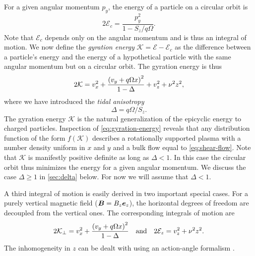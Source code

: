 \documentclass[aps,pre,notitlepage,amsmath,amssymb,amsfonts,nobibnotes,nofootinbib]{revtex4-1}
\begin{document}
For a given angular momentum $p_y$, the energy of a particle on a circular
orbit is
\begin{equation}
  2\mathcal{E}_c = \frac{p_y^2}{1 - S_z/q\Omega}.
\end{equation}
Note that $\mathcal{E}_c$ depends only on the angular momentum and is thus an
integral of motion. We now define the \emph{gyration energy}
$\mathcal{K}=\mathcal{E}-\mathcal{E}_c$ as the difference between a particle's
energy and the energy of a hypothetical particle with the same angular
momentum but on a circular orbit. The gyration energy is thus
\begin{equation}
  \label{eq:gyration-energy}
  2\mathcal{K} =
  v_x^2 + \frac{{(v_y + q\Omega x)}^2}{1-\Delta} + v_z^2 + \vfreq^2 z^2,
\end{equation}
where we have introduced the \emph{tidal anisotropy}
\begin{equation}
  \label{eq:tidal-anisotropy}
  \Delta = q\Omega/S_z.
\end{equation}
The gyration energy $\mathcal{K}$ is the natural generalization of the
epicyclic energy \citep{Shu1969} to charged particles. Inspection of
\cref{eq:gyration-energy} reveals that any distribution function of the form
$f(\mathcal{K})$ describes a rotationally supported plasma with a number
density uniform in $x$ and $y$ and a bulk flow equal to \cref{eq:shear-flow}.
Note that $\mathcal{K}$ is manifestly positive definite as long as $\Delta<1$.
In this case the circular orbit thus minimizes the energy for a given angular
momentum. We discuss the case $\Delta\ge1$ in \cref{sec:delta} below. For now
we will assume that $\Delta<1$.

A third integral of motion is easily derived in two important special cases.
For a purely vertical magnetic field ($\bm{B}=B_z\bm{e}_z$), the horizontal
degrees of freedom are decoupled from the vertical ones. The corresponding
integrals of motion are
\begin{equation}
  2\mathcal{K}_\perp =
  v_x^2 + \frac{{(v_y + q\Omega x)}^2}{1-\Delta}
  \quad\textrm{and}\quad
  2\mathcal{E}_z = v_z^2 + \nu^2 z^2.
\end{equation}
The inhomogeneity in $z$ can be dealt with using an action-angle formalism
\citep[e.g.][]{Kaufman1971,Kaufman1972}.
\end{document}
